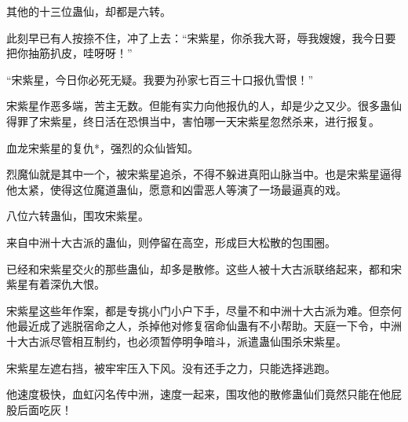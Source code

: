 \begin{this_body}
其他的十三位蛊仙，却都是六转。

此刻早已有人按捺不住，冲了上去：“宋紫星，你杀我大哥，辱我嫂嫂，我今日要把你抽筋扒皮，哇呀呀！”

“宋紫星，今日你必死无疑。我要为孙家七百三十口报仇雪恨！”

宋紫星作恶多端，苦主无数。但能有实力向他报仇的人，却是少之又少。很多蛊仙得罪了宋紫星，终日活在恐惧当中，害怕哪一天宋紫星忽然杀来，进行报复。

血龙宋紫星的复仇*，强烈的众仙皆知。

烈魔仙就是其中一个，被宋紫星追杀，不得不躲进真阳山脉当中。也是宋紫星逼得他太紧，使得这位魔道蛊仙，愿意和凶雷恶人等演了一场最逼真的戏。

八位六转蛊仙，围攻宋紫星。

来自中洲十大古派的蛊仙，则停留在高空，形成巨大松散的包围圈。

已经和宋紫星交火的那些蛊仙，却多是散修。这些人被十大古派联络起来，都和宋紫星有着深仇大恨。

宋紫星这些年作案，都是专挑小门小户下手，尽量不和中洲十大古派为难。但奈何他最近成了逃脱宿命之人，杀掉他对修复宿命仙蛊有不小帮助。天庭一下令，中洲十大古派尽管相互制约，也必须暂停明争暗斗，派遣蛊仙围杀宋紫星。

宋紫星左遮右挡，被牢牢压入下风。没有还手之力，只能选择逃跑。

他速度极快，血虹闪名传中洲，速度一起来，围攻他的散修蛊仙们竟然只能在他屁股后面吃灰！

\end{this_body}

